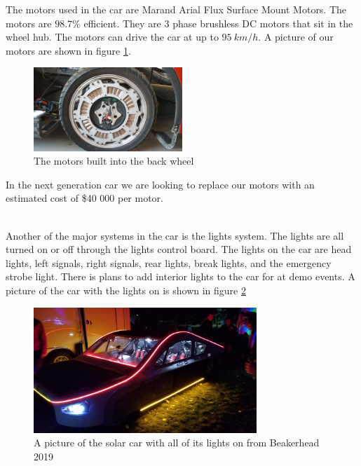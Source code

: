 \documentclass{article}
\begin{document}
    The motors used in the car are Marand Arial Flux Surface Mount
    Motors. The motors are $98.7\%$ efficient. They are 3 phase
    brushless DC motors that sit in the wheel hub. The motors can drive
    the car at up to $95\ km/h$. A picture of our motors are shown in
    figure \ref{fig:motor}.
    \begin{figure}[H]
        \centering
        \includegraphics[width=0.5\textwidth]{images/motor.jpg}
        \caption{The motors built into the back wheel}
        \label{fig:motor}
    \end{figure}
    \noindent In the next generation car we are looking to replace our
    motors with an estimated cost of \$40 000 per motor.\\\\
    \par Another of the major systems in the car is the lights system.
    The lights are all turned on or off through the lights control board.
    The lights on the car are head lights, left signals, right signals,
    rear lights, break lights, and the emergency strobe light. There is
    plans to add interior lights to the car for at demo events. A
    picture of the car with the lights on is shown in figure
    \ref{fig:lights}
    \begin{figure}[H]
        \centering
        \includegraphics[width=0.75\textwidth]{images/lights.jpg}
        \caption{A picture of the solar car with all of its lights on
        from Beakerhead 2019}
        \label{fig:lights}
    \end{figure}
\end{document}
